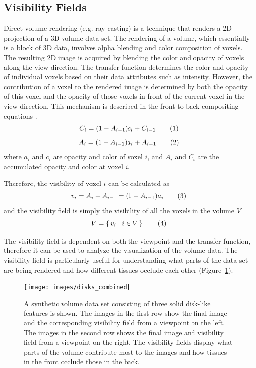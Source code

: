 \subsection{Visibility Fields \label{visibility_fields}}
Direct volume rendering (e.g. ray-casting) is a technique that renders a 2D projection of a 3D volume data set. The rendering of a volume, which essentially is a block of 3D data, involves alpha blending and color composition of voxels. The resulting 2D image is acquired by blending the color and opacity of voxels along the view direction. The transfer function determines the color and opacity of individual voxels based on their data attributes such as intensity. However, the contribution of a voxel to the rendered image is determined by both the opacity of this voxel and the opacity of those voxels in front of the current voxel in the view direction.
This mechanism is described in the front-to-back compositing equations \cite{emsenhuber_visibility_2008}.
\[
C_{i}=(1-A_{i-1})c_{i}+C_{i-1}
\addtag \]
\[
A_{i}=(1-A_{i-1})a_{i}+A_{i-1}
\addtag \]
where $ a_{i} $ and $ c_{i} $ are opacity and color of voxel $ i $, and $A_{i}$ and $C_{i}$ are the accumulated opacity and color at  voxel $ i $.

Therefore, the visibility of voxel $ i $ can be calculated as
\[ v_{i}=A_{i}-A_{i-1}=(1-A_{i-1})a_{i} 
\addtag \]
and the visibility field is simply the visibility of all the voxels in the volume $ V $
\[ V=\set{v_{i}|i \in V} 
\addtag \]

The visibility field is dependent on both the viewpoint and the transfer function, therefore it can be used to analyze the visualization of the volume data. The visibility field is particularly useful for understanding what parts of the data set are being rendered and how different tissues occlude each other (Figure~\ref{fig:disks_combined}).

\begin{figure}
	\centering
	\texttt{[image: images/disks\_combined]}
	\caption[A synthetic volume data set consisting of three solid disk-like features is shown.]{A synthetic volume data set consisting of three solid disk-like features is shown. The images in the first row show the final image and the corresponding visibility field from a viewpoint on the left. The images in the second row shows the final image and visibility field from a viewpoint on the right. The visibility fields display what parts of the volume contribute most to the images and how tissues in the front occlude those in the back.}
	\label{fig:disks_combined}
\end{figure}

